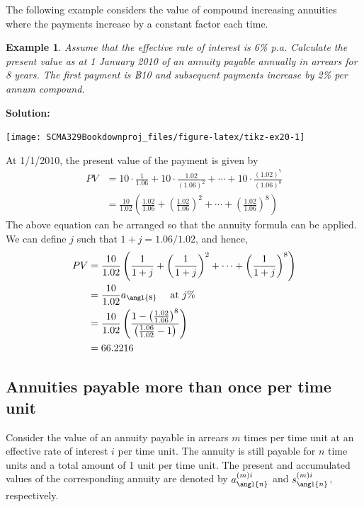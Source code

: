 \documentclass[
]{book}
\theoremstyle{definition}
\theoremstyle{definition}
\newtheorem{example}{Example}[chapter]
\theoremstyle{definition}
\theoremstyle{definition}
\theoremstyle{remark}
\begin{document}
The following example considers the value of compound increasing
annuities where the payments increase by a constant factor each time.

\begin{example}
\emph{Assume that the effective rate of interest is 6\% p.a. Calculate the
present value as at 1 January 2010 of an annuity payable annually in
arrears for 8 years. The first payment is ฿10 and subsequent payments
increase by 2\% per annum compound.}
\end{example}

\textbf{Solution:}

\begin{center}\texttt{[image: SCMA329Bookdownproj\_files/figure-latex/tikz-ex20-1]} \end{center}

At 1/1/2010, the present value of the payment is given by
\[\begin{aligned}
    PV &= 10 \cdot \frac{1}{1.06} + 10 \cdot \frac{1.02}{(1.06)^2} + \cdots +  10 \cdot \frac{(1.02)^7}{(1.06)^8} \\
        &= \frac{10}{1.02} \left(  \frac{1.02}{1.06} +  \left(  \frac{1.02}{1.06}  \right)^2 + \cdots +
    \left(  \frac{1.02}{1.06}  \right)^8  \right)\end{aligned}\] The
above equation can be arranged so that the annuity formula can be
applied. We can define \(j\) such that \(1 + j = 1.06/1.02\), and hence,
\[\begin{aligned}
    PV &= \frac{10}{1.02} \left(  \frac{1}{1 + j} +  \left(  \frac{1}{1+j}  \right)^2 + \cdots +
    \left(  \frac{1}{1+j}  \right)^8  \right)  \\
    &=   \frac{10}{1.02}  a_\angl{8} \quad  \text{ at } j\% \\
    &=  \frac{10}{1.02} \left(   \frac{1 - \left(\frac{1.02}{1.06}\right)^8   }{\left(   \frac{1.06}{1.02}   - 1 \right)}  \right) \\
    &= 66.2216\end{aligned}\]

\hypertarget{annuities-payable-more-than-once-per-time-unit}{%
\subsection{Annuities payable more than once per time unit}\label{annuities-payable-more-than-once-per-time-unit}}

Consider the value of an annuity payable in arrears \(m\) times per time
unit at an effective rate of interest \(i\) per time unit. The annuity is
still payable for \(n\) time units and a total amount of 1 unit per time
unit. The present and accumulated values of the corresponding annuity
are denoted by \(a^{(m)i}_\angl{n}\) and \(s^{(m)i}_\angl{n}\),
respectively.
\end{document}
